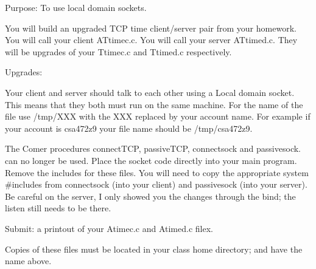 

\parindent 0pt

Purpose: To use local domain sockets.

You will build an upgraded TCP time client/server pair
from your homework.
You will call your client {\ltt{}ATtimec.c}.
You will call your server {\ltt{}ATtimed.c}.
They will be upgrades of your {\ltt{}Ttimec.c} and {\ltt{}Ttimed.c}
respectively.

Upgrades:

Your client and server should talk to each other using a Local domain
socket.
This means that they both must run on the same machine.
For the name of the file use {\ltt{}/tmp/XXX} with the {\ltt{}XXX}
replaced by your account name. For example if your account
is {\ltt{}csa472z9} your file name should be {\ltt{}/tmp/csa472z9}.

The Comer procedures {\ltt{}connectTCP}, {\ltt{}passiveTCP},
{\ltt{}connectsock} and {\ltt{}passivesock}.
can no longer be used.
Place the socket code directly into your main program.
Remove the includes for these files.
You will need to copy the appropriate
system {\ltt{}#include}s from {\ltt{}connectsock} (into your client)
and {\ltt{}passivesock} (into your server).
Be careful on the server, I only showed you the changes through the
{\ltt{}bind}; the {\ltt{}listen} still needs to be there.

Submit: a printout of your {\ltt{}Atimec.c} and {\ltt{}Atimed.c} filex.

Copies of these files must be located in your class home directory;
and have the name above.

\bye
